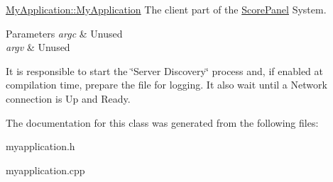 \mbox{\hyperlink{classMyApplication_a4b9e70ce40a83d5d4ae99253a6933c02}{My\+Application\+::\+My\+Application}} The client part of the \mbox{\hyperlink{classScorePanel}{Score\+Panel}} System. 


\begin{DoxyParams}{Parameters}
{\em argc} & Unused \\
\hline
{\em argv} & Unused\\
\hline
\end{DoxyParams}
It is responsible to start the \char`\"{}\+Server Discovery\char`\"{} process and, if enabled at compilation time, prepare the file for logging. It also wait until a Network connection is Up and Ready. 

The documentation for this class was generated from the following files\+:\begin{DoxyCompactItemize}
\item 
myapplication.\+h\item 
myapplication.\+cpp\end{DoxyCompactItemize}
